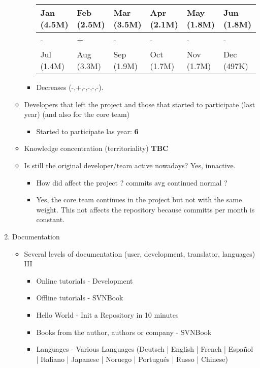 \documentclass[11pt]{scrartcl}
\begin{document}
\begin{enumerate}
\begin{itemize}
\begin{itemize}
                \begin{tabular}{|l|l|l|l|l|l|}
                    \hline
            	    Jan (4.5M) & Feb (2.5M) & Mar (3.5M) & Apr (2.1M) & May (1.8M) & Jun (1.8M)\\
            	    \hline
            	    - & + & - & - & - & -\\
                    \hline
                    Jul (1.4M) & Aug (3.3M) & Sep (1.9M) & Oct (1.7M) & Nov (1.7M) & Dec (497K)\\
                    \hline
                \end{tabular}
            \item Decreases (-,+,-,-,-,-).
        \end{itemize}
	    \item Developers that left the project and those that started to participate (last year) (and also for the core team)
	    \begin{itemize}
            \item Started to participate las year: \textbf{6}
        \end{itemize}
	    \item Knowledge concentration (territoriality) \textbf{TBC}
	    \item Is still the original developer/team active nowadays? Yes, innactive.
	    \begin{itemize}
            \item How did affect the project ? commits avg continued normal ?
            \item Yes, the core team continues in the project but not with the same weight. This not affects the repository because committs per month is constant.
        \end{itemize}
    \end{itemize}

    \item Documentation
    \begin{itemize}
 	    \item Several levels of documentation (user, development, translator, languages) III
     	    \begin{itemize}
                \item Online tutorials - Development
                \item Offline tutorials - SVNBook
                \item Hello World - Init a Repository in 10 minutes
                \item Books from the author, authors or company - SVNBook
                \item Languages - Various Languages (Deutsch | English | French | Espa\~nol | Italiano | Japanese | Noruego | Portugu\'es | Russo | Chinese)
            \end{itemize}
    \end{itemize}

\end{enumerate}
\end{document}
